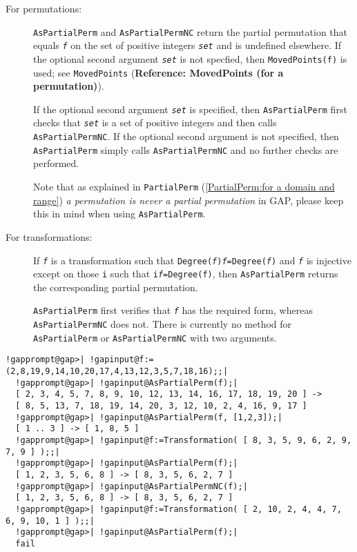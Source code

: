 \documentclass[a4paper,11pt]{report}
\begin{document}
{{{ 
\begin{description}
\item[{For permutations:}] \texttt{AsPartialPerm} and \texttt{AsPartialPermNC} return the partial permutation that equals \mbox{\texttt{\mdseries\slshape f}} on the set of positive integers \mbox{\texttt{\mdseries\slshape set}} and is undefined elsewhere. If the optional second argument \mbox{\texttt{\mdseries\slshape set}} is not specfied, then \texttt{MovedPoints(f)} is used; see \texttt{MovedPoints} (\textbf{Reference: MovedPoints (for a permutation)}).

 If the optional second argument \mbox{\texttt{\mdseries\slshape set}} is specified, then \texttt{AsPartialPerm} first checks that \mbox{\texttt{\mdseries\slshape set}} is a set of positive integers and then calls \texttt{AsPartialPermNC}. If the optional second argument is not specified, then \texttt{AsPartialPerm} simply calls \texttt{AsPartialPermNC} and no further checks are performed. 

 Note that as explained in \texttt{PartialPerm} (\ref{PartialPerm:for a domain and range}) \emph{a permutation is never a partial permutation} in \textsf{GAP}, please keep this in mind when using \texttt{AsPartialPerm}. 
\item[{For transformations:}]  If \mbox{\texttt{\mdseries\slshape f}} is a transformation such that \texttt{Degree(\mbox{\texttt{\mdseries\slshape f}})\texttt{}\mbox{\texttt{\mdseries\slshape f}}=Degree(\mbox{\texttt{\mdseries\slshape f}})} and \mbox{\texttt{\mdseries\slshape f}} is injective except on those \texttt{i} such that \texttt{i\texttt{}\mbox{\texttt{\mdseries\slshape f}}=Degree(f)}, then \texttt{AsPartialPerm} returns the corresponding partial permutation.

 \texttt{AsPartialPerm} first verifies that \mbox{\texttt{\mdseries\slshape f}} has the required form, whereas \texttt{AsPartialPermNC} does not. There is currently no method for \texttt{AsPartialPerm} or \texttt{AsPartialPermNC} with two arguments. 
\end{description}
 
\begin{Verbatim}[commandchars=!@|,fontsize=\small,frame=single,label=Example]
  !gapprompt@gap>| !gapinput@f:=(2,8,19,9,14,10,20,17,4,13,12,3,5,7,18,16);;|
  !gapprompt@gap>| !gapinput@AsPartialPerm(f);|
  [ 2, 3, 4, 5, 7, 8, 9, 10, 12, 13, 14, 16, 17, 18, 19, 20 ] -> 
  [ 8, 5, 13, 7, 18, 19, 14, 20, 3, 12, 10, 2, 4, 16, 9, 17 ]
  !gapprompt@gap>| !gapinput@AsPartialPerm(f, [1,2,3]);|
  [ 1 .. 3 ] -> [ 1, 8, 5 ]
  !gapprompt@gap>| !gapinput@f:=Transformation( [ 8, 3, 5, 9, 6, 2, 9, 7, 9 ] );;|
  !gapprompt@gap>| !gapinput@AsPartialPerm(f);|
  [ 1, 2, 3, 5, 6, 8 ] -> [ 8, 3, 5, 6, 2, 7 ]
  !gapprompt@gap>| !gapinput@AsPartialPermNC(f);|
  [ 1, 2, 3, 5, 6, 8 ] -> [ 8, 3, 5, 6, 2, 7 ]
  !gapprompt@gap>| !gapinput@f:=Transformation( [ 2, 10, 2, 4, 4, 7, 6, 9, 10, 1 ] );;|
  !gapprompt@gap>| !gapinput@AsPartialPerm(f);|
  fail
\end{Verbatim}
 }

}}
\end{document}

